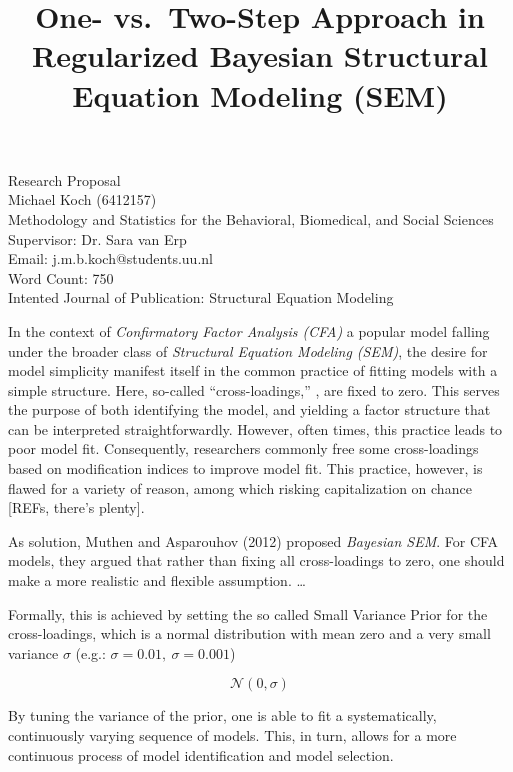 \documentclass[
  english,
  man]{apa6}
\title{One- vs.~Two-Step Approach in Regularized Bayesian Structural Equation Modeling (SEM)}
\author{\phantom{0}}
\date{}
\affiliation{\phantom{0}}
\begin{document}
\maketitle

\vfill
Research Proposal \\
Michael Koch (6412157)\\
Methodology and Statistics for the Behavioral, Biomedical, and Social Sciences \\
Supervisor: Dr. Sara van Erp \\ 
Email: j.m.b.koch@students.uu.nl \\
Word Count: 750 \\
Intented Journal of Publication: Structural Equation Modeling

\setcounter{page}{0}
\thispagestyle{empty}
\pagestyle{plain}

\clearpage

In the context of \emph{Confirmatory Factor Analysis (CFA)} a popular model falling under the broader class of \emph{Structural Equation Modeling (SEM)}, the desire for model simplicity manifest itself in the common practice of fitting models with a simple structure. Here, so-called ``cross-loadings,'' , are fixed to zero. This serves the purpose of both identifying the model, and yielding a factor structure that can be interpreted straightforwardly. However, often times, this practice leads to poor model fit. Consequently, researchers commonly free some cross-loadings based on modification indices to improve model fit. This practice, however, is flawed for a variety of reason, among which risking capitalization on chance {[}REFs, there's plenty{]}.

As solution, Muthen and Asparouhov (2012) proposed \emph{Bayesian SEM}. For CFA models, they argued that rather than fixing all cross-loadings to zero, one should make a more realistic and flexible assumption. \ldots{}

Formally, this is achieved by setting the so called Small Variance Prior for the cross-loadings, which is a normal distribution with mean zero and a very small variance \(\sigma\) (e.g.: \(\sigma = 0.01, \  \sigma = 0.001\))

\[\mathcal{N}(0, \sigma)\]

By tuning the variance of the prior, one is able to fit a systematically, continuously varying sequence of models. This, in turn, allows for a more continuous process of model identification and model selection.
\end{document}
